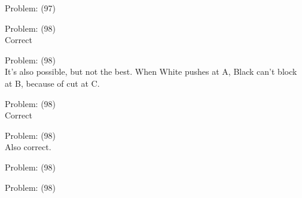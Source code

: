 \documentclass[11pt]{article}
\begin{document}
\begin{minipage}[t]{0.5\textwidth}
  {\centering
  
  Problem: (97)\\
  
  }
\end{minipage}
\begin{minipage}[t]{0.5\textwidth}
  {\centering
  
  Problem: (98)\\
  Correct\\
  }
\end{minipage}
\begin{minipage}[t]{0.5\textwidth}
  {\centering
  
  Problem: (98)\\
  It's also possible, but not the best. When White pushes at A, Black can't block at B, because of cut at C.\\
  }
\end{minipage}
\begin{minipage}[t]{0.5\textwidth}
  {\centering
  
  Problem: (98)\\
  Correct\\
  }
\end{minipage}
\begin{minipage}[t]{0.5\textwidth}
  {\centering
  
  Problem: (98)\\
  Also correct.\\
  }
\end{minipage}
\begin{minipage}[t]{0.5\textwidth}
  {\centering
  
  Problem: (98)\\
  
  }
\end{minipage}
\begin{minipage}[t]{0.5\textwidth}
  {\centering
  
  Problem: (98)\\
  
  }
\end{minipage}
\end{document}
